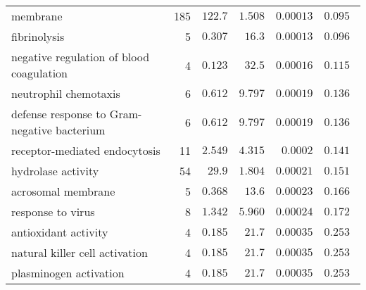\begin{longtable}{|l|r|r|r|r|r|}
    membrane                                          & 185                     & $ 122.7$                & $ 1.508$   & $0.00013$            & $ 0.095~~$                    \\
    fibrinolysis                                      & 5                       & $ 0.307$                & $  16.3$     & $0.00013$            & $ 0.096~~$                    \\
    negative regulation of blood coagulation          & 4                       & $ 0.123$                & $  32.5$     & $0.00016$            & $ 0.115~~$                    \\
    neutrophil chemotaxis                             & 6                       & $ 0.612$                & $ 9.797$   & $0.00019$            & $ 0.136~~$                    \\
    defense response to Gram-negative bacterium       & 6                       & $ 0.612$                & $ 9.797$   & $0.00019$            & $ 0.136~~$                    \\
    receptor-mediated endocytosis                     & 11                      & $ 2.549$                & $ 4.315$   & $0.0002$             & $ 0.141~~$                    \\
    hydrolase activity                                & 54                      & $  29.9$                  & $ 1.804$   & $0.00021$            & $ 0.151~~$                    \\
    acrosomal membrane                                & 5                       & $ 0.368$                & $  13.6$     & $0.00023$            & $ 0.166~~$                    \\
    response to virus                                 & 8                       & $ 1.342$                & $ 5.960$   & $0.00024$            & $ 0.172~~$                    \\
    antioxidant activity                              & 4                       & $ 0.185$                & $  21.7$     & $0.00035$            & $ 0.253~~$                    \\
    natural killer cell activation                    & 4                       & $ 0.185$                & $  21.7$     & $0.00035$            & $ 0.253~~$                    \\
    plasminogen activation                            & 4                       & $ 0.185$                & $  21.7$     & $0.00035$            & $ 0.253~~$                    \\

\end{longtable}

